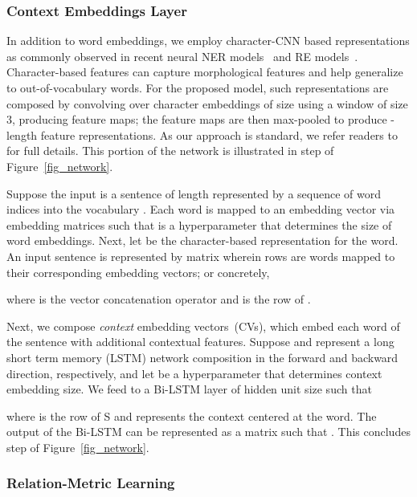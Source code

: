 \documentclass{clv3}
\newcommand{\nth}[1]{}
\newcommand{\ere}{RE}
\newcommand*\circled[1]{\tikz[baseline=(char.base)]{
            \node[shape=circle,draw,inner sep=1pt] (char) {#1};}}
\begin{document}
\subsubsection{Context Embeddings Layer}

In addition to word embeddings, we employ character-CNN based representations as commonly observed in recent neural NER models~\cite{chiu2016named} and \ere{} models~\cite{li2017neural}. Character-based features can capture morphological features and help generalize to out-of-vocabulary words. 
For the proposed model, such representations are composed by convolving over character embeddings of size  using a window of size 3, producing  feature maps; the feature maps are then max-pooled to produce -length feature representations. As our approach is standard, we refer readers to  for full details. This portion of the network is illustrated in step \circled{1} of Figure~\ref{fig_network}.

Suppose the input is a sentence of length  represented by a sequence of word indices  into the vocabulary . Each word is mapped to an embedding vector via embedding matrices  such that  is a hyperparameter that determines the size of word  embeddings. Next, let  be the character-based representation for the \nth{i} word. An input sentence is represented by matrix  wherein rows are words mapped to their corresponding embedding vectors; or concretely,  

where  is the vector concatenation operator and  is the \nth{i} row of . 

Next, we compose \emph{context} embedding vectors~(CVs), which embed each word of the sentence with additional contextual features. Suppose  and  represent a long short term memory (LSTM) network composition in the forward and backward direction, respectively, and let  be a hyperparameter that determines context embedding size. We feed  to a Bi-LSTM layer of hidden unit size  such that 
\begin{comment}
 ,  ,
  and , for 
\end{comment}
 
where  is the \nth{i} row of S and  represents the context centered at the \nth{i} word. The output of the Bi-LSTM can be represented as a matrix  such that . This concludes step \circled{2} of Figure~\ref{fig_network}.


\subsubsection{Relation-Metric Learning}
\end{document}
